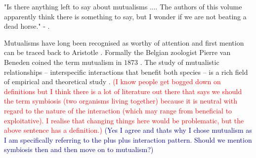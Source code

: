 \documentclass[12pt]{article}
\newcommand{\cha}[1]{\textcolor{darkblue}{(#1)}}
\newcommand{\paul}[1]{\textcolor{red}{(#1)}}
\begin{document}
"Is there anything left to say about mutualisms .... The authors of this volume apparently think there is something to say, but I wonder if we are not beating a dead horse." 
- \cite{janzen:bookchapter:1985}.

Mutualisms have long been recognised as worthy of attention and first mention can be traced back to Aristotle \citep{aristotle:book:350}.
Formally the Belgian zoologist Pierre van Beneden coined the term mutualism in $1873$ \citep{bronstein:book:2003}.
The study of mutualistic relationships -- interspecific interactions that benefit both species -- is a rich field of empirical and theoretical study 
\citep{boucher:book:1985,hinton:PTENHS:1951,wilson:AmNat:1983,bronstein:QRB:1994,pierce:ARE:2002,kiers:Nature:2003,bshary:ASB:2004} \citep{poulin:JTB:1995,doebeli:PNAS:1998,noe:book:2001,johnstone:ECL:2002,bergstrom:PNAS:2003,hoeksema:AmNat:2003,akcay:PRSB:2007,bshary:Nature:2008}.
\paul{I know people get bogged down on definitions but I think there is a lot of literature out there that says we should  the term symbiosis (two organisms living together) because it is neutral with regard to the nature of the interaction (which may range from beneficial to exploitative).  I realise that changing things here would be problematic, but the above sentence has a definition.}
\cha{Yes I agree and thats why I chose mutualism as I am specifically referring to the plus plus interaction pattern. Should we mention symbiosis then and then move on to mutualism?}
\end{document}
